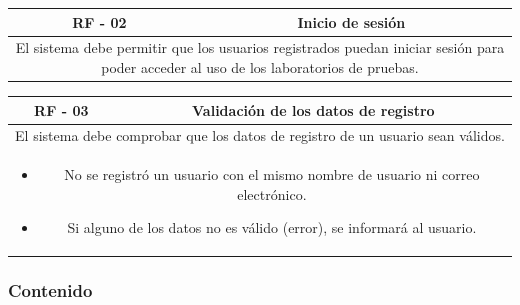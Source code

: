                 \begin{table}[!htbp]
                    \centering

                    \begin{tabular}{|c|c|}
                        \hline
                        \textbf{RF - 02} & \textbf{Inicio de sesión} \\
                        \hline
                        \multicolumn{2}{|p{15cm}|}{
                            El sistema debe permitir que los usuarios registrados puedan iniciar sesión para poder acceder al uso de los laboratorios de pruebas.
                        } \\
                        \hline
                    \end{tabular}

                    \label{tab:RF2}
                \end{table}
                
                \begin{table}[!htbp]
                    \centering

                    \begin{tabular}{|c|c|}
                        \hline
                        \textbf{RF - 03} & \textbf{Validación de los datos de registro} \\
                        \hline
                        \multicolumn{2}{|p{15cm}|}{
                            El sistema debe comprobar que los datos de registro de un usuario sean válidos.
                        } \\
                        \hline
                        \multicolumn{2}{|p{15cm}|}{
                            \begin{itemize}
                                \item No se registró un usuario con el mismo nombre de usuario ni correo electrónico.
                                \item Si alguno de los datos no es válido (error), se informará al usuario.
                            \end{itemize}
                            } \\
                        \hline
                    \end{tabular}

                    \label{tab:RF3}
                \end{table}
            
            \subsubsection{Contenido}
            
